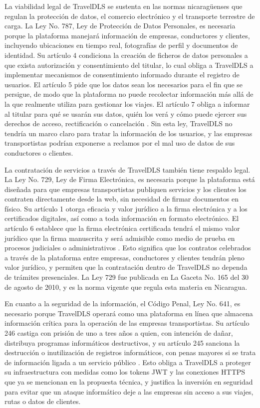 La viabilidad legal de TravelDLS se sustenta en las normas nicaragüenses que regulan la protección de datos, el comercio electrónico y el transporte terrestre de carga. La Ley No. 787, Ley de Protección de Datos Personales, es necesaria porque la plataforma manejará información de empresas, conductores y clientes, incluyendo ubicaciones en tiempo real, fotografías de perfil y documentos de identidad. Su artículo 4 condiciona la creación de ficheros de datos personales a que exista autorización y consentimiento del titular, lo cual obliga a TravelDLS a implementar mecanismos de consentimiento informado durante el registro de usuarios. El artículo 5 pide que los datos sean los necesarios para el fin que se persigue, de modo que la plataforma no puede recolectar información más allá de la que realmente utiliza para gestionar los viajes. El artículo 7 obliga a informar al titular para qué se usarán sus datos, quién los verá y cómo puede ejercer sus derechos de acceso, rectificación o cancelación \parencite[Arts.4,5 y 7]{ley787_2012}. Sin esta ley, TravelDLS no tendría un marco claro para tratar la información de los usuarios, y las empresas transportistas podrían exponerse a reclamos por el mal uso de datos de sus conductores o clientes.

La contratación de servicios a través de TravelDLS también tiene respaldo legal. La Ley No. 729, Ley de Firma Electrónica, es necesaria porque la plataforma está diseñada para que empresas transportistas publiquen servicios y los clientes los contraten directamente desde la web, sin necesidad de firmar documentos en físico. Su artículo 1 otorga eficacia y valor jurídico a la firma electrónica y a los certificados digitales, así como a toda información en formato electrónico. El artículo 6 establece que la firma electrónica certificada tendrá el mismo valor jurídico que la firma manuscrita y será admisible como medio de prueba en procesos judiciales o administrativos \parencite[Arts. 1 y 6]{ley729_2010}. Esto significa que los contratos celebrados a través de la plataforma entre empresas, conductores y clientes tendrán pleno valor jurídico, y permiten que la contratación dentro de TravelDLS no dependa de trámites presenciales. La Ley 729 fue publicada en La Gaceta No. 165 del 30 de agosto de 2010, y es la norma vigente que regula esta materia en Nicaragua.

En cuanto a la seguridad de la información, el Código Penal, Ley No. 641, es necesario porque TravelDLS operará como una plataforma en línea que almacena información crítica para la operación de las empresas transportistas. Su artículo 246 castiga con prisión de uno a tres años a quien, con intención de dañar, distribuya programas informáticos destructivos, y su artículo 245 sanciona la destrucción o inutilización de registros informáticos, con penas mayores si se trata de información ligada a un servicio público \parencite[Arts.245--246]{ley641_2008}. Esto obliga a TravelDLS a proteger su infraestructura con medidas como los tokens JWT y las conexiones HTTPS que ya se mencionan en la propuesta técnica, y justifica la inversión en seguridad para evitar que un ataque informático deje a las empresas sin acceso a sus viajes, rutas o datos de clientes.

